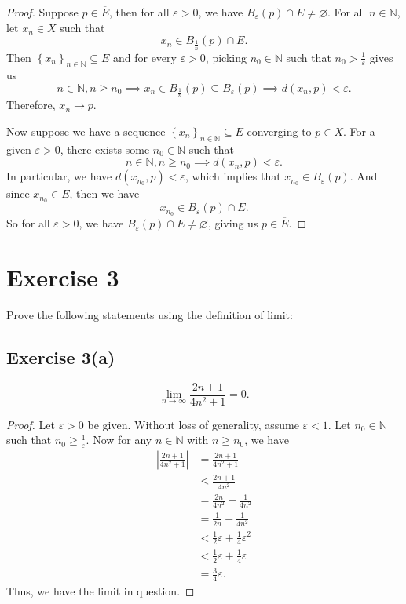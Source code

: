\documentclass[12pt]{article}
\newenvironment{problem}
    {\begin{lrbox}{\mybox}\begin{minipage}{0.98\textwidth}}
    {\end{minipage}\end{lrbox}\framebox[\textwidth]{\usebox{\mybox}}}
\let\eps\varepsilon %
\let\emptyset\varnothing %
\newcommand{\N}{\mathbb{N}} %
\newcommand{\<}{\left\langle} %
\renewcommand{\>}{\right\rangle} %
\newcommand{\seq}[2][n]{\left\{#2\right\}_{#1\in\N}} %
\let\clo\overline %
\begin{document}
\begin{proof}
    Suppose $p\in\clo{E}$, then for all $\eps>0$, we have $B_\eps(p)\cap E \ne \emptyset$. For all $n\in\N$, let $x_n\in X$ such that
    \[x_n \in B_{\frac1n}{(p)}\cap E.\]
    Then $\seq{x_n}\subseteq E$ and for every $\eps>0$, picking $n_0\in\N$ such that $n_0>\frac1\eps$ gives us
    \[n\in\N, n\geq n_0 \implies x_n\in B_{\frac1n}(p) \subseteq B_\eps(p) \implies d(x_n,p) < \eps.\]
    Therefore, $x_n\to p$.
    
    Now suppose we have a sequence $\seq{x_n}\subseteq E$ converging to $p\in X$. For a given $\eps>0$, there exists some $n_0\in\N$ such that
    \[n\in\N, n\geq n_0 \implies d(x_n,p) < \eps.\]
    In particular, we have $d(x_{n_0},p)<\eps$, which implies that $x_{n_0}\in B_\eps(p)$. And since $x_{n_0}\in E$, then we have
    \[x_{n_0} \in B_\eps(p)\cap E.\]
    So for all $\eps>0$, we have $B_\eps(p)\cap E \ne \emptyset$, giving us $p\in\clo{E}$.
    
\end{proof}

\newpage
\section*{Exercise 3}
\begin{problem}
    Prove the following statements using the definition of limit:
\end{problem}

\subsection*{Exercise 3(a)}
\begin{problem}
    \begin{equation}
        \lim_{n\to \infty} \frac{2n+1}{4n^2+1} = 0.
    \end{equation}
\end{problem}

\begin{proof}
    Let $\eps > 0$ be given. Without loss of generality, assume $\eps < 1$. Let $n_0\in\N$ such that $n_0 \geq \frac1\eps$. Now for any $n\in\N$ with $n\geq n_0$, we have
    \begin{align*}
        \left|\frac{2n+1}{4n^2 + 1}\right |
            &= \frac{2n+1}{4n^2+1} \\
            &\leq \frac{2n+1}{4n^2} \\
            &= \frac{2n}{4n^2} + \frac{1}{4n^2} \\
            &= \frac{1}{2n} + \frac{1}{4n^2} \\
            &< \frac{1}{2}\eps + \frac{1}{4}\eps^2 \\
            &< \frac{1}{2}\eps + \frac{1}{4}\eps \\
            &= \frac34 \eps.
    \end{align*}
    Thus, we have the limit in question.
    
    
\end{proof}
\end{document}
